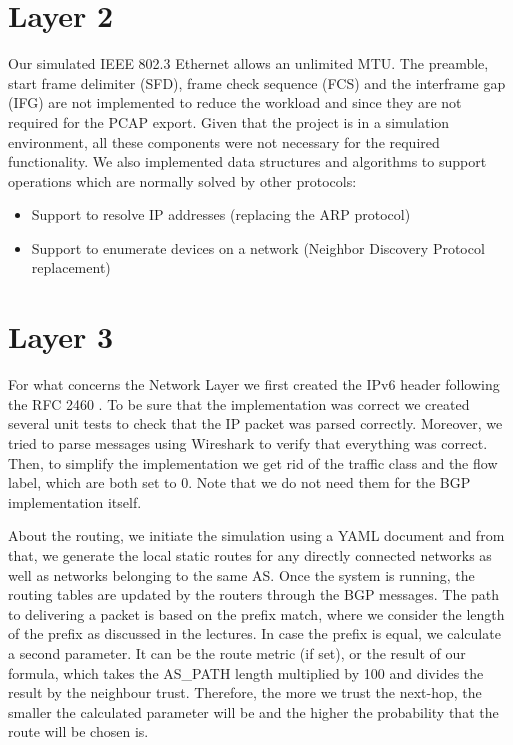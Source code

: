\section{Layer 2}\label{layer2}
Our simulated IEEE 802.3 Ethernet allows an unlimited MTU.
The preamble, start frame delimiter (SFD), frame check sequence (FCS) and the interframe gap (IFG) are not implemented to reduce the workload and since they are not required for the PCAP export.
Given that the project is in a simulation environment, all these components were not necessary for the required functionality.\newline
We also implemented data structures and algorithms to support operations which are normally solved by other protocols:
\begin{itemize}
    \item Support to resolve IP addresses (replacing the ARP protocol)
    \item Support to enumerate devices on a network (Neighbor Discovery Protocol replacement)
\end{itemize}


\section{Layer 3}\label{layer3}
For what concerns the Network Layer we first created the IPv6 header following the RFC 2460 \cite{rfc2460}.\newline
To be sure that the implementation was correct we created several unit tests to check that the IP packet was parsed correctly.
Moreover, we tried to parse messages using Wireshark to verify that everything was correct.\newline
Then, to simplify the implementation we get rid of the traffic class and the flow label, which are both set to 0.
Note that we do not need them for the BGP implementation itself.
\par About the routing, we initiate the simulation using a YAML document and from that, we generate the local static routes for any directly connected networks as well as networks belonging to the same AS.\newline
Once the system is running, the routing tables are updated by the routers through the BGP messages.
The path to delivering a packet is based on the prefix match, where we consider the length of the prefix as discussed in the lectures.\newline
In case the prefix is equal, we calculate a second parameter.
It can be the route metric (if set), or the result of our formula, which takes the AS\_PATH length multiplied by 100 and divides the result by the neighbour trust.
Therefore, the more we trust the next-hop, the smaller the calculated parameter will be and the higher the probability that the route will be chosen is.

